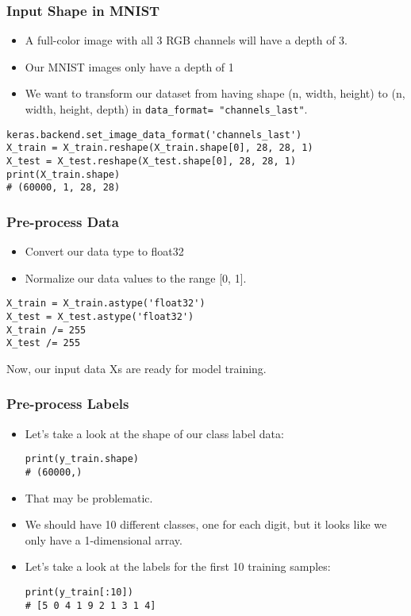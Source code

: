 \begin{frame}[fragile] \frametitle{Input Shape in MNIST}

\begin{itemize}
\item A full-color image with all 3 RGB channels will have a depth of 3.
\item Our MNIST images only have a depth of 1
\item We want to transform our dataset from having shape (n, width, height) to (n, width, height, depth) in \lstinline|data_format= "channels_last"|.
\end{itemize}
\begin{lstlisting}
keras.backend.set_image_data_format('channels_last')
X_train = X_train.reshape(X_train.shape[0], 28, 28, 1)
X_test = X_test.reshape(X_test.shape[0], 28, 28, 1)
print(X_train.shape)
# (60000, 1, 28, 28)
\end{lstlisting}
\end{frame}


\begin{frame}[fragile] \frametitle{Pre-process Data}

\begin{itemize}
\item Convert our data type to float32
\item Normalize our data values to the range [0, 1].
\end{itemize}
\begin{lstlisting}
X_train = X_train.astype('float32')
X_test = X_test.astype('float32')
X_train /= 255
X_test /= 255
\end{lstlisting}
Now, our input data Xs are ready for model training.
\end{frame}

\begin{frame}[fragile] \frametitle{Pre-process Labels}

\begin{itemize}
\item Let's take a look at the shape of our class label data:
\begin{lstlisting}
print(y_train.shape)
# (60000,)
\end{lstlisting}
\item That may be problematic. 
\item We should have 10 different classes, one for each digit, but it looks like we only have a 1-dimensional array.
\item Let's take a look at the labels for the first 10 training samples:
\begin{lstlisting}
print(y_train[:10])
# [5 0 4 1 9 2 1 3 1 4]
\end{lstlisting}
\end{itemize}
\end{frame}


